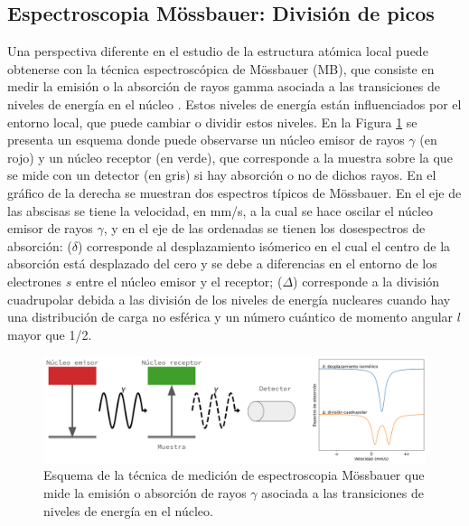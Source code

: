 \subsection{Espectroscopia Mössbauer: División de picos}

Una perspectiva diferente en el estudio de la estructura atómica local puede 
obtenerse con la técnica espectroscópica de Mössbauer (MB), que consiste en medir 
la emisión o la absorción de rayos gamma asociada a las transiciones de niveles
de energía en el núcleo \cite{long2013}. Estos niveles de energía están 
influenciados por el entorno local, que puede cambiar o dividir estos niveles.
En la Figura \ref{fig:esquema-mossbauer} se presenta un esquema donde puede observarse un núcleo emisor de rayos $\gamma$ (en rojo) y un núcleo receptor (en verde), que corresponde a la muestra sobre la que se mide con un detector (en gris) si hay absorción o no de dichos rayos. En el gráfico de la derecha se muestran dos espectros típicos de Mössbauer. En el eje de las abscisas se tiene la velocidad, en mm/s, a la cual se hace oscilar el núcleo emisor de rayos $\gamma$, y en el eje de las ordenadas se tienen los dosespectros de absorción: ($\delta$) corresponde al desplazamiento isómerico en el cual el centro de la absorción está desplazado del cero y se debe a diferencias en el entorno de los electrones $s$ entre el núcleo emisor y el receptor; ($\Delta$) corresponde a la división cuadrupolar debida a las división de los niveles de energía nucleares cuando hay una distribución de carga no esférica y un número cuántico de momento angular $l$ mayor que 1/2.
\begin{figure}[h!]
    \centering
    \includegraphics[width=\textwidth]{Silicio/prediccion/resultados/mossbauer/esquema_mossbauer.png}
    \caption{Esquema de la técnica de medición de espectroscopia Mössbauer que mide la emisión o absorción de rayos $\gamma$ asociada a las transiciones de niveles de energía en el núcleo.}
    \label{fig:esquema-mossbauer}
\end{figure}

